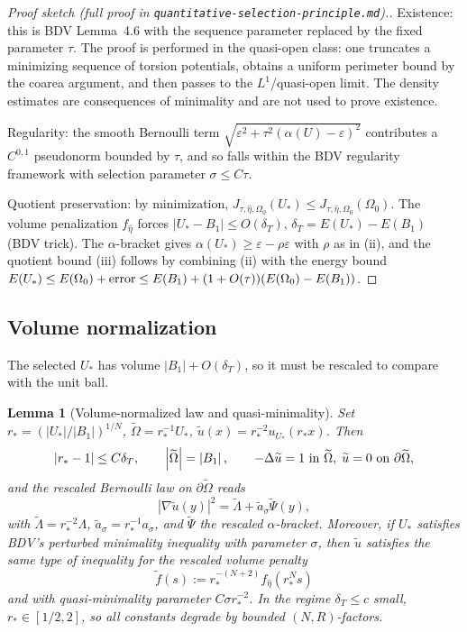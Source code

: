 \documentclass[11pt]{amsart}
\newtheorem{lemma}[theorem]{Lemma}
\theoremstyle{definition}
\newcommand{\abs}[1]{\left|#1\right|}
\begin{document}
\begin{proof}[Proof sketch (full proof in \texttt{quantitative-selection-principle.md}).]
Existence: this is BDV Lemma~4.6 with the sequence parameter replaced by the
fixed parameter $\tau$. The proof is performed in the quasi-open class:
one truncates a minimizing sequence of torsion potentials, obtains a uniform
perimeter bound by the coarea argument, and then passes to the $L^1$/quasi-open
limit. The density estimates are consequences of minimality and are not used
to prove existence.

Regularity: the smooth Bernoulli term
$\sqrt{\varepsilon^2+\tau^2(\alpha(U)-\varepsilon)^2}$
contributes a $C^{0,1}$ pseudonorm bounded by $\tau$, and so falls within
the BDV regularity framework with selection parameter $\sigma\le C\tau$.

Quotient preservation: by minimization, $J_{\tau,\hat\eta,\Omega_0}(U_*)\le
J_{\tau,\hat\eta,\Omega_0}(\Omega_0)$. The volume penalization $f_{\hat\eta}$
forces $\abs{U_*-B_1}\le O(\delta_T)$, $\delta_T=E(U_*)-E(B_1)$ (BDV trick).
The $\alpha$-bracket gives
$\alpha(U_*)\ge\varepsilon-\rho\varepsilon$ with $\rho$ as in (ii), and the
quotient bound (iii) follows by combining (ii) with the energy bound
$E(U_*)\le E(\Omega_0)+\hbox{error}\le E(B_1)+(1+O(\tau))(E(\Omega_0)-E(B_1))$.
\end{proof}

\subsection{Volume normalization}\label{sec:volnorm}

The selected $U_*$ has volume $\abs{B_1}+O(\delta_T)$, so it must be
rescaled to compare with the unit ball.

\begin{lemma}[Volume-normalized law and quasi-minimality]\label{lem:rescale}
Set $r_*=(\abs{U_*}/\abs{B_1})^{1/N}$, $\widetilde\Omega=r_*^{-1}U_*$,
$\widetilde u(x)=r_*^{-2}u_{U_*}(r_*x)$. Then
\[
\abs{r_*-1}\le C\delta_T,\qquad
\abs{\widetilde\Omega}=\abs{B_1},\qquad
-\Delta\widetilde u=1\hbox{ in }\widetilde\Omega,\;\widetilde u=0\hbox{ on }\partial\widetilde\Omega,
\]
and the rescaled Bernoulli law on $\partial\widetilde\Omega$ reads
\[
\abs{\nabla\widetilde u(y)}^2=\widetilde\Lambda+\widetilde a_\sigma\widetilde\Psi(y),
\]
with $\widetilde\Lambda=r_*^{-2}\Lambda$, $\widetilde a_\sigma=r_*^{-1}a_\sigma$,
and $\widetilde\Psi$ the rescaled $\alpha$-bracket. Moreover, if $U_*$
satisfies BDV's perturbed minimality inequality with parameter $\sigma$, then
$\widetilde u$ satisfies the same type of inequality for the rescaled volume
penalty
\[
\widetilde f(s):=r_*^{-(N+2)}f_{\hat\eta}(r_*^Ns)
\]
and with quasi-minimality parameter $C\sigma r_*^{-2}$. In the regime
$\delta_T\le c$ small, $r_*\in[1/2,2]$, so all constants degrade by bounded
$(N,R)$-factors.
\end{lemma}
\end{document}
